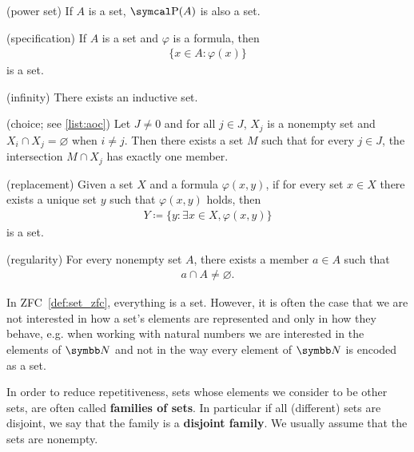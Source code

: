 \begin{definition}
\begin{description}
    (power set) If \( A \) is a set, \( \Power(A) \) is also a set.

    (specification) If \( A \) is a set and \( \varphi \) is a formula, then
    \begin{align*}
      \{ x \in A \colon \varphi(x) \}
    \end{align*}
    is a set.

    (infinity) There exists an inductive set.

    (choice; see \cref{list:aoc}) Let \( J \neq 0 \) and for all \( j \in J \), \( X_j \) is a nonempty set and \( X_i \cap X_j = \varnothing \) when \( i \neq j \). Then there exists a set \( M \) such that for every \( j \in J \), the intersection \( M \cap X_j \) has exactly one member.

    (replacement) Given a set \( X \) and a formula \( \varphi(x, y) \), if for every set \( x \in X \) there exists a unique set \( y \) such that \( \varphi(x, y) \) holds, then
    \begin{align*}
      Y \coloneqq \{ y \colon \exists x \in X, \varphi(x, y) \}
    \end{align*}
    is a set.

    (regularity) For every nonempty set \( A \), there exists a member \( a \in A \) such that
    \begin{align*}
      a \cap A \neq \varnothing.
    \end{align*}
  \end{description}
\end{definition}

\begin{note}\label{note:family_of_sets}
  In ZFC~\cref{def:set_zfc}, everything is a set. However, it is often the case that we are not interested in how a set's elements are represented and only in how they behave, e.g. when working with natural numbers we are interested in the elements of \( \BB{N} \) and not in the way every element of \( \BB{N} \) is encoded as a set.

  In order to reduce repetitiveness, sets whose elements we consider to be other sets, are often called \textbf{families of sets}. In particular if all (different) sets are disjoint, we say that the family is a \textbf{disjoint family}. We usually assume that the sets are nonempty.
\end{note}

